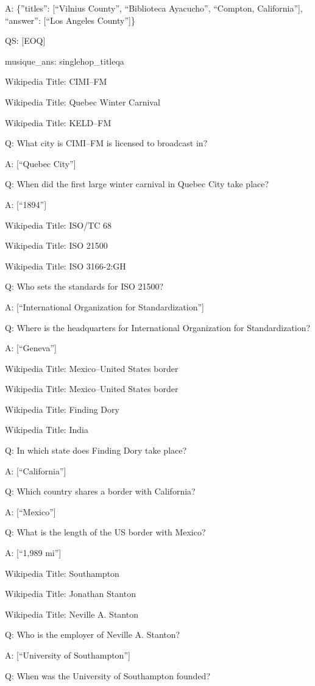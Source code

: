 \documentclass[
]{article}
\begin{document}
A: \{''titles'': {[}``Vilnius County'', ``Biblioteca Ayacucho'',
``Compton, California''{]}, ``answer'': {[}``Los Angeles County''{]}\}

QS: {[}EOQ{]}

musique\_ans: singlehop\_titleqa

Wikipedia Title: CIMI--FM

Wikipedia Title: Quebec Winter Carnival

Wikipedia Title: KELD--FM

Q: What city is CIMI--FM is licensed to broadcast in?

A: {[}``Quebec City''{]}

Q: When did the first large winter carnival in Quebec City take place?

A: {[}``1894''{]}

Wikipedia Title: ISO/TC 68

Wikipedia Title: ISO 21500

Wikipedia Title: ISO 3166-2:GH

Q: Who sets the standards for ISO 21500?

A: {[}``International Organization for Standardization''{]}

Q: Where is the headquarters for International Organization for
Standardization?

A: {[}``Geneva''{]}

Wikipedia Title: Mexico--United States border

Wikipedia Title: Mexico--United States border

Wikipedia Title: Finding Dory

Wikipedia Title: India

Q: In which state does Finding Dory take place?

A: {[}``California''{]}

Q: Which country shares a border with California?

A: {[}``Mexico''{]}

Q: What is the length of the US border with Mexico?

A: {[}``1,989 mi''{]}

Wikipedia Title: Southampton

Wikipedia Title: Jonathan Stanton

Wikipedia Title: Neville A. Stanton

Q: Who is the employer of Neville A. Stanton?

A: {[}``University of Southampton''{]}

Q: When was the University of Southampton founded?
\end{document}
